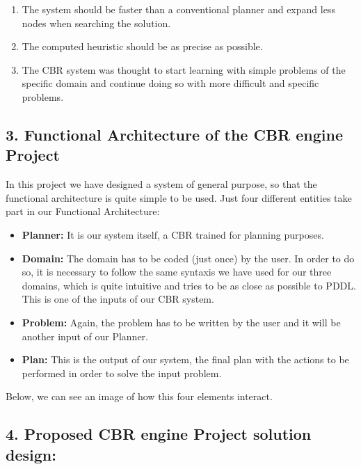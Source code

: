\documentclass[11pt]{article}
\providecommand{\tightlist}{%
      \setlength{\itemsep}{0pt}\setlength{\parskip}{0pt}}
\begin{document}
\begin{enumerate}
\def\labelenumi{\arabic{enumi}.}
\item
  The system should be faster than a conventional planner and expand
  less nodes when searching the solution.
\item
  The computed heuristic should be as precise as possible.
\item
  The CBR system was thought to start learning with simple problems of
  the specific domain and continue doing so with more difficult and
  specific problems.
\end{enumerate}

    \subsection{3. Functional Architecture of the CBR engine
Project}\label{functional-architecture-of-the-cbr-engine-project}

In this project we have designed a system of general purpose, so that
the functional architecture is quite simple to be used. Just four
different entities take part in our Functional Architecture:

\begin{itemize}
\tightlist
\item
  \textbf{Planner:} It is our system itself, a CBR trained for planning
  purposes.
\item
  \textbf{Domain:} The domain has to be coded (just once) by the user.
  In order to do so, it is necessary to follow the same syntaxis we have
  used for our three domains, which is quite intuitive and tries to be
  as close as possible to PDDL. This is one of the inputs of our CBR
  system.
\item
  \textbf{Problem:} Again, the problem has to be written by the user and
  it will be another input of our Planner.
\item
  \textbf{Plan:} This is the output of our system, the final plan with
  the actions to be performed in order to solve the input problem.
\end{itemize}

Below, we can see an image of how this four elements interact.

    \subsection{4. Proposed CBR engine Project solution
design:}\label{proposed-cbr-engine-project-solution-design}
\end{document}
